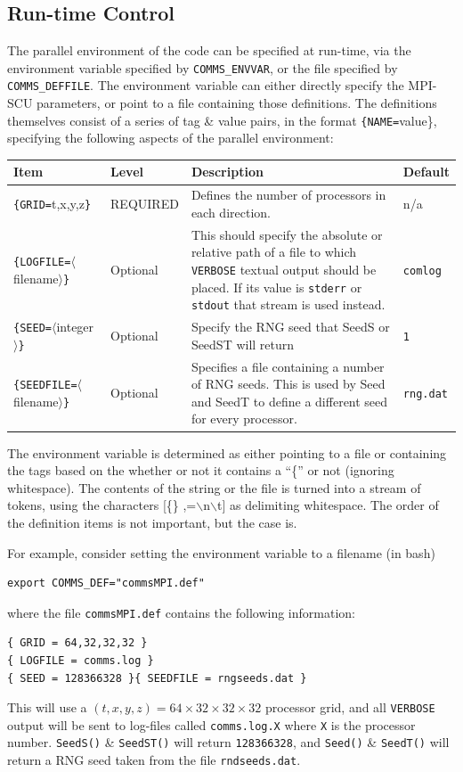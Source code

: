 \documentclass[12pt]{article}
\newcommand{\cde}[1]{{\tt #1}}            %
\begin{document}
\subsection{Run-time Control}
The parallel environment of the code can be specified at run-time, via
the environment variable specified by \cde{COMMS\_ENVVAR}, or the file
specified by \cde{COMMS\_DEFFILE}.  The environment variable can
either directly specify the MPI-SCU parameters, or point to a file
containing those definitions.  The definitions themselves consist of a
series of tag \& value pairs, in the format \cde{\{NAME=}value{\}},
specifying the following aspects of the parallel environment:

\begin{tabularx}{16cm}{l|l|X|l}
{\bf Item} & {\bf Level} & {\bf Description} & {\bf Default} \\ 
\hline
\cde{\{GRID=}t,x,y,z\cde{\}} & REQUIRED & Defines the number of processors in each
direction.  & n/a \\
\hline
\cde{\{LOGFILE=}$\langle$filename$\rangle$\cde{\}} & Optional & This should specify the absolute or
relative path of a file to which \cde{VERBOSE} textual output should be placed.  If its value is \cde{stderr} or \cde{stdout} that stream is used instead. & \cde{comlog} \\
\hline
\cde{\{SEED=}$\langle$integer$\rangle$\cde{\}} & Optional & Specify the RNG seed that SeedS or SeedST will
return & \cde{1} \\
\hline
\cde{\{SEEDFILE=}$\langle$filename$\rangle$\cde{\}} & Optional & Specifies a file containing a 
number of RNG seeds.  This is used by Seed and SeedT to define a
different seed for every processor. & \cde{rng.dat} \\
\end{tabularx}

The environment variable is determined as either pointing to a file or
containing the tags based on the whether or not it contains a ``\{'' or not
(ignoring whitespace).  The contents of the string or the file is
turned into a stream of tokens, using the characters [\{\} ,=$\backslash$n$\backslash$t] as
delimiting whitespace.  The order of the definition items is not
important, but the case is.

For example, consider setting the environment variable to a filename
(in bash)
\begin{verbatim}
export COMMS_DEF="commsMPI.def"
\end{verbatim}
where the file \cde{commsMPI.def} contains the following information:
\begin{verbatim}
{ GRID = 64,32,32,32 }
{ LOGFILE = comms.log }
{ SEED = 128366328 }{ SEEDFILE = rngseeds.dat }
\end{verbatim}
This will use a $(t,x,y,z) = 64{\times}32{\times}32{\times}32$
processor grid, and all \cde{VERBOSE} output will be sent to log-files
called \cde{comms.log.X} where \cde{X} is the processor number.
\cde{SeedS()} \& \cde{SeedST()} will return \cde{128366328}, and
\cde{Seed()} \& \cde{SeedT()} will return a RNG seed taken from the
file \cde{rndseeds.dat}.  
\end{document}
